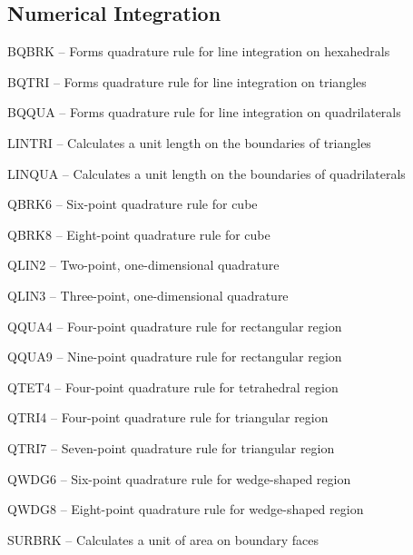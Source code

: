 \subsection*{Numerical Integration}    %
\begin{list}{}{\leftmargin=57pt }
\item[BQBRK \hfill]  -- Forms quadrature rule for line integration on hexahedrals
\item[BQTRI \hfill]  -- Forms quadrature rule for line integration on triangles
\item[BQQUA \hfill]  -- Forms quadrature rule for line integration on quadrilaterals
\item[LINTRI \hfill] -- Calculates a unit length on the boundaries of triangles
\item[LINQUA \hfill] -- Calculates a unit length on the boundaries of quadrilaterals
\item[QBRK6 \hfill]  -- Six-point quadrature rule for cube
\item[QBRK8 \hfill]  -- Eight-point quadrature rule for cube
\item[QLIN2 \hfill]  -- Two-point, one-dimensional quadrature
\item[QLIN3 \hfill]  -- Three-point, one-dimensional quadrature
\item[QQUA4 \hfill]  -- Four-point quadrature rule for rectangular region
\item[QQUA9 \hfill]  -- Nine-point quadrature rule for rectangular region
\item[QTET4 \hfill]  -- Four-point quadrature rule for tetrahedral region
\item[QTRI4 \hfill]  -- Four-point quadrature rule for triangular region
\item[QTRI7 \hfill]  -- Seven-point quadrature rule for triangular region
\item[QWDG6 \hfill]  -- Six-point quadrature rule for wedge-shaped region
\item[QWDG8 \hfill]  -- Eight-point quadrature rule for wedge-shaped region
\item[SURBRK \hfill] -- Calculates a unit of area on boundary faces
\end{list}
